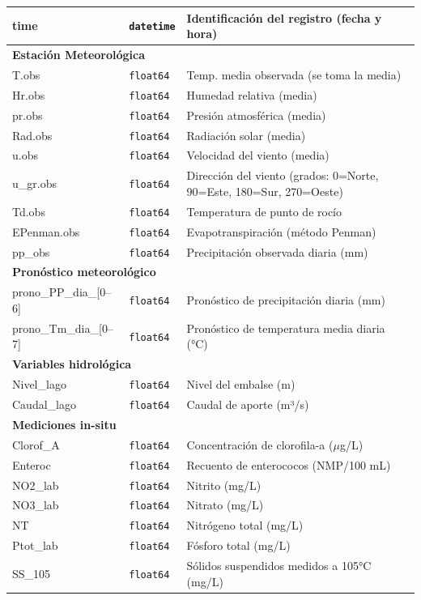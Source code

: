 \documentclass[
  11pt,
  pdftitle=TFI - Tschopp Joaquín S.,
  pdfauthor=Tschopp Joaquín S.,
  pdfcreator=LaTeX with hyperref,
]{report}  %
\begin{document}
\begin{longtable}{llp{8cm}}
time & \texttt{datetime} & Identificación del registro (fecha y hora) \\
\hline
\multicolumn{3}{l}{\textbf{Estación Meteorológica}} \\
T.obs & \texttt{float64} & Temp. media observada (se toma la media) \\
Hr.obs & \texttt{float64} & Humedad relativa (media) \\
pr.obs & \texttt{float64} & Presión atmosférica (media) \\
Rad.obs & \texttt{float64} & Radiación solar (media) \\
u.obs & \texttt{float64} & Velocidad del viento (media) \\
u\_gr.obs & \texttt{float64} & Dirección del viento (grados: 0=Norte, 90=Este, 180=Sur, 270=Oeste) \\
Td.obs & \texttt{float64} & Temperatura de punto de rocío \\
EPenman.obs & \texttt{float64} & Evapotranspiración (método Penman) \\
pp\_obs & \texttt{float64} & Precipitación observada diaria (mm) \\
\hline
\multicolumn{3}{l}{\textbf{Pronóstico meteorológico}} \\
prono\_PP\_dia\_[0–6] & \texttt{float64} & Pronóstico de precipitación diaria (mm) \\
prono\_Tm\_dia\_[0–7] & \texttt{float64} & Pronóstico de temperatura media diaria (°C) \\
\hline
\multicolumn{3}{l}{\textbf{Variables hidrológica}} \\
Nivel\_lago & \texttt{float64} & Nivel del embalse (m) \\
Caudal\_lago & \texttt{float64} & Caudal de aporte (m³/s) \\
\hline
\multicolumn{3}{l}{\textbf{Mediciones in-situ}} \\
Clorof\_A & \texttt{float64} & Concentración de clorofila-a (\(\mu\)g/L) \\
Enteroc & \texttt{float64} & Recuento de enterococos (NMP/100 mL) \\
NO2\_lab & \texttt{float64} & Nitrito (mg/L) \\
NO3\_lab & \texttt{float64} & Nitrato (mg/L) \\
NT & \texttt{float64} & Nitrógeno total (mg/L) \\
Ptot\_lab & \texttt{float64} & Fósforo total (mg/L) \\
SS\_105 & \texttt{float64} & Sólidos suspendidos medidos a 105°C (mg/L) \\

\end{longtable}
\end{document}
